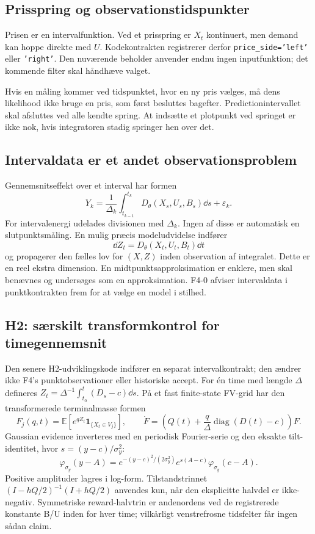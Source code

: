 \subsection{Prisspring og observationstidspunkter}
Prisen er en intervalfunktion. Ved et prisspring er \(X_t\) kontinuert, men demand kan hoppe direkte med \(U\). Kodekontrakten registrerer derfor \texttt{price\_side='left'} eller \texttt{'right'}. Den nuværende beholder anvender endnu ingen inputfunktion; det kommende filter skal håndhæve valget.

Hvis en måling kommer ved tidspunktet, hvor en ny pris vælges, må dens likelihood ikke bruge en pris, som først besluttes bagefter. Predictionintervallet skal afsluttes ved alle kendte spring. At indsætte et plotpunkt ved springet er ikke nok, hvis integratoren stadig springer hen over det.

\subsection{Intervaldata er et andet observationsproblem}
Gennemsnitseffekt over et interval har formen
\begin{equation}
 Y_k=\frac1{\Delta_k}\int_{t_{k-1}}^{t_k}
 D_\theta(X_s,U_s,B_s)\dd s+\varepsilon_k.
 \label{eq:average}
\end{equation}
For intervalenergi udelades divisionen med \(\Delta_k\). Ingen af disse er automatisk en slutpunktsmåling. En mulig præcis modeludvidelse indfører
\begin{equation}
 \dd Z_t=D_\theta(X_t,U_t,B_t)\dd t
 \label{eq:accumulator}
\end{equation}
og propagerer den fælles lov for \((X,Z)\) inden observation af integralet. Dette er en reel ekstra dimension. En midtpunktsapproksimation er enklere, men skal benævnes og undersøges som en approksimation. F4-0 afviser intervaldata i punktkontrakten frem for at vælge en model i stilhed.

\subsection{H2: særskilt transformkontrol for timegennemsnit}
Den senere H2-udviklingskode indfører en separat intervalkontrakt; den ændrer
ikke F4's punktobservationer eller historiske accept. For én time med længde
\(\Delta\) defineres \(Z_t=\Delta^{-1}\int_{t_0}^t(D_s-c)\dd s\).
På et fast finite-state FV-grid har den transformerede terminalmasse formen
\[
 F_j(q,t)=\mathbb E[e^{qZ_t}\mathbf 1_{\{X_t\in V_j\}}],\qquad
 \dot F=\left(Q(t)+\frac q\Delta\operatorname{diag}(D(t)-c)\right)F.
\]
Gaussian evidence inverteres med en periodisk Fourier-serie og den eksakte
tilt-identitet, hvor \(s=(y-c)/\sigma_y^2\):
\[
 \varphi_{\sigma_y}(y-A)=
 e^{-(y-c)^2/(2\sigma_y^2)}e^{s(A-c)}\varphi_{\sigma_y}(c-A).
\]
Positive amplituder lagres i log-form. Tilstandstrinnet
\((I-hQ/2)^{-1}(I+hQ/2)\) anvendes kun, når den eksplicitte halvdel er
ikke-negativ. Symmetriske reward-halvtrin er andenordens ved de registrerede
konstante B/U inden for hver time; vilkårligt venstrefrosne tidsfelter får
ingen sådan claim.

